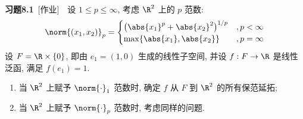 	\textbf{习题8.1}\ [作业]\ \ 设 $ 1\leqslant p\leqslant\infty $, 考虑 $ \R^{2} $ 上的 $ p $ 范数:
	\[
		\norm{(x_{1}, x_{2})}_{p}=
		\begin{cases}
			\big( \abs{x_{1}}^{p}+\abs{x_{2}}^{2} \big)^{1/p} & ,p<\infty\\
			\max\{\abs{x_{1}}, \abs{x_{2}}\} & ,p = \infty
		\end{cases}
	\]
	设 $ F=\R\times\{ 0 \} $, 即由 $ e_{1}=(1, 0) $ 生成的线性子空间, 并设 $ f:F\to\R $ 是线性泛函, 满足 $ f(e_{1})=1 $.
	\begin{enumerate}
		\item 当 $ \R^{2} $ 上赋予 $ \norm{\cdot}_{1} $ 范数时, 确定 $ f $ 从 $ F $ 到 $ \R^{2} $ 的所有保范延拓;
		\item 当 $ \R^{2} $ 上赋予 $ \norm{\cdot}_{p} $ 范数时, 考虑同样的问题.
	\end{enumerate}
